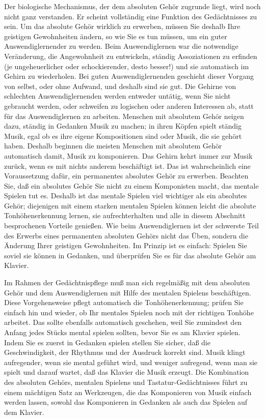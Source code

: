 Der biologische Mechanismus, der dem absoluten Gehör zugrunde liegt, wird noch nicht ganz verstanden.
Er scheint vollständig eine Funktion des Gedächtnisses zu sein.
Um das absolute Gehör wirklich zu erwerben, müssen Sie deshalb Ihre geistigen Gewohnheiten ändern, so wie Sie es tun müssen, um ein guter Auswendiglernender zu werden.
Beim Auswendiglernen war die notwendige Veränderung, die Angewohnheit zu entwickeln, ständig Assoziationen zu erfinden (je ungeheuerlicher oder schockierender, desto besser!) und sie automatisch im Gehirn zu wiederholen.
Bei guten Auswendiglernenden geschieht dieser Vorgang von selbst, oder ohne Aufwand, und deshalb sind sie gut.
Die Gehirne von schlechten Auswendiglernenden werden entweder untätig, wenn Sie nicht gebraucht werden, oder schweifen zu logischen oder anderen Interessen ab, statt für das Auswendiglernen zu arbeiten.
Menschen mit absolutem Gehör neigen dazu, ständig in Gedanken Musik zu machen; in ihren Köpfen spielt ständig Musik, egal ob es ihre eigene Kompositionen sind oder Musik, die sie gehört haben.
Deshalb beginnen die meisten Menschen mit absolutem Gehör automatisch damit, Musik zu komponieren.
Das Gehirn kehrt immer zur Musik zurück, wenn es mit nichts anderem beschäftigt ist.
Das ist wahrscheinlich eine Voraussetzung dafür, ein permanentes absolutes Gehör zu erwerben.
Beachten Sie, daß ein absolutes Gehör Sie nicht zu einem Komponisten macht, das mentale Spielen tut es.
Deshalb ist das mentale Spielen viel wichtiger als ein absolutes Gehör; diejenigen mit einem starken mentalen Spielen können leicht die absolute Tonhöhenerkennung lernen, sie aufrechterhalten und alle in diesem Abschnitt besprochenen Vorteile genießen.
Wie beim Auswendiglernen ist der schwerste Teil des Erwerbs eines permanenten absoluten Gehörs nicht das Üben, sondern die Änderung Ihrer geistigen Gewohnheiten.
Im Prinzip ist es einfach: Spielen Sie soviel sie können in Gedanken, und überprüfen Sie es für das absolute Gehör am Klavier.

Im Rahmen der Gedächtnispflege muß man sich regelmäßig mit dem absoluten Gehör und dem Auswendiglernen mit Hilfe des mentalen Spielens beschäftigen.
Diese Vorgehensweise pflegt automatisch die Tonhöhenerkennung; prüfen Sie einfach hin und wieder, ob Ihr mentales Spielen noch mit der richtigen Tonhöhe arbeitet.
Das sollte ebenfalls automatisch geschehen, weil Sie zumindest den Anfang jedes Stücks mental spielen sollten, bevor Sie es am Klavier spielen.
Indem Sie es zuerst in Gedanken spielen stellen Sie sicher, daß die Geschwindigkeit, der Rhythmus und der Ausdruck korrekt sind.
Musik klingt aufregender, wenn sie mental geführt wird, und weniger aufregend, wenn man sie spielt und darauf wartet, daß das Klavier die Musik erzeugt.
Die Kombination des absoluten Gehörs, mentalen Spielens und Tastatur-Gedächtnisses führt zu einem mächtigen Satz an Werkzeugen, die das Komponieren von Musik einfach werden lassen, sowohl das Komponieren in Gedanken als auch das Spielen auf dem Klavier.

